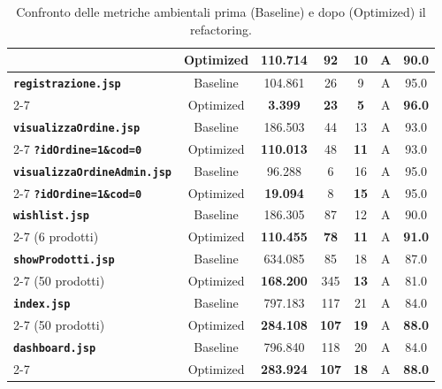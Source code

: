 \begin{table}[h!]
\begin{tabular}{|l|c|c|c|c|c|c|}
& Optimized & \textbf{110.714} & 92 & \textbf{10} & A & 90.0 \\ \hline
\hline
\textbf{\texttt{registrazione.jsp}} & Baseline & 104.861 & 26 & 9 & A & 95.0 \\ \cline{2-7} 
& Optimized & \textbf{3.399} & \textbf{23} & \textbf{5} & A & \textbf{96.0} \\ \hline
\hline
\textbf{\texttt{visualizzaOrdine.jsp}} & Baseline & 186.503 & 44 & 13 & A & 93.0 \\ \cline{2-7} 
\textbf{\texttt{?idOrdine=1\&cod=0}} & Optimized & \textbf{110.013} & 48 & \textbf{11} & A & 93.0 \\ \hline
\hline
\textbf{\texttt{visualizzaOrdineAdmin.jsp}} & Baseline & 96.288 & 6 & 16 & A & 95.0 \\ \cline{2-7} 
\textbf{\texttt{?idOrdine=1\&cod=0}} & Optimized & \textbf{19.094} & 8 & \textbf{15} & A & 95.0 \\ \hline
\hline
\textbf{\texttt{wishlist.jsp}} & Baseline & 186.305 & 87 & 12 & A & 90.0 \\ \cline{2-7} 
(6 prodotti) & Optimized & \textbf{110.455} & \textbf{78} & \textbf{11} & A & \textbf{91.0} \\ \hline
\hline
\textbf{\texttt{showProdotti.jsp}} & Baseline & 634.085 & 85 & 18 & A & 87.0 \\ \cline{2-7} 
(50 prodotti) & Optimized & \textbf{168.200} & 345 & \textbf{13} & A & 81.0 \\ \hline
\hline
\textbf{\texttt{index.jsp}} & Baseline & 797.183 & 117 & 21 & A & 84.0 \\ \cline{2-7} 
(50 prodotti) & Optimized & \textbf{284.108} & \textbf{107} & \textbf{19} & A & \textbf{88.0} \\ \hline
\hline
\textbf{\texttt{dashboard.jsp}} & Baseline & 796.840 & 118 & 20 & A & 84.0 \\ \cline{2-7} 
& Optimized & \textbf{283.924} & \textbf{107} & \textbf{18} & A & \textbf{88.0} \\ \hline
\end{tabular}
\caption{Confronto delle metriche ambientali prima (Baseline) e dopo (Optimized) il refactoring.}
\label{tab:ecoindex_jsp_comparison}
\end{table}

